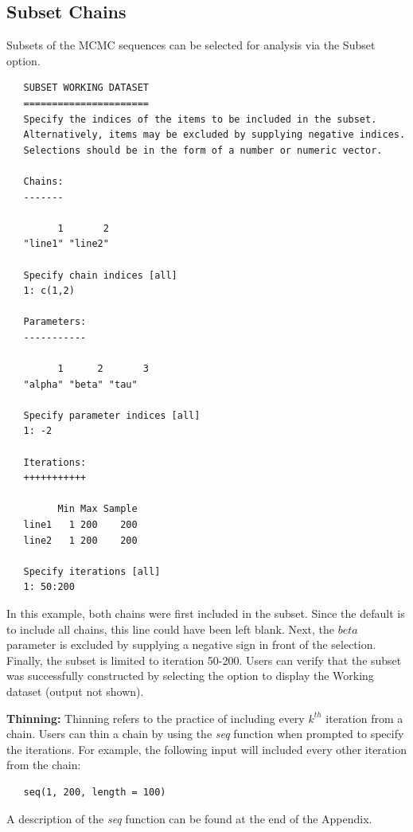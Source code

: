 \documentclass[12pt,letterpaper]{report}
\begin{document}
\subsection{Subset Chains}
\noindent
Subsets of the MCMC sequences can be selected for analysis via the Subset
option.
\vskip 9pt
\begin{tiny}
\begin{verbatim}
   SUBSET WORKING DATASET
   ======================
   Specify the indices of the items to be included in the subset.
   Alternatively, items may be excluded by supplying negative indices.
   Selections should be in the form of a number or numeric vector.

   Chains:
   -------

         1       2
   "line1" "line2"

   Specify chain indices [all]
   1: c(1,2)

   Parameters:
   -----------

         1      2       3
   "alpha" "beta" "tau"

   Specify parameter indices [all]
   1: -2

   Iterations:
   +++++++++++

         Min Max Sample
   line1   1 200    200
   line2   1 200    200

   Specify iterations [all]
   1: 50:200
\end{verbatim}
\end{tiny}
In this example, both chains were first included in the subset. Since the
default is to include all chains, this line could have been left blank. Next,
the $beta$ parameter is excluded by supplying a negative sign in front of the
selection. Finally, the subset is limited to iteration 50-200. Users can verify
that the subset was successfully constructed by selecting the option to display
the Working dataset (output not shown).

\noindent
{\bf Thinning:} Thinning refers to the practice of including every $k^{th}$
iteration from a chain. Users can thin a chain by using the {\it seq} function
when prompted to specify the iterations. For example, the following input will
included every other iteration from the chain:
\vskip 9pt
\begin{tiny}
\begin{verbatim}
   seq(1, 200, length = 100)
\end{verbatim}
\end{tiny}
A description of the {\it seq} function can be found at the end of the Appendix.
\end{document}
